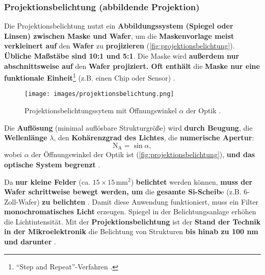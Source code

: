 \documentclass{article} %
\begin{document}


\vspace{1em}

\subsubsection{Projektionsbelichtung (abbildende Projektion)}

Die Projektionsbelichtung nutzt ein \textbf{Abbildungssystem (Spiegel oder Linsen) zwischen Maske und Wafer}, um die \textbf{Maskenvorlage meist verkleinert auf} den \textbf{Wafer} zu \textbf{projizieren} (\autoref{fig:projektionsbelichtung}). \textbf{Übliche Maßstäbe sind 10:1 und 5:1}. Die Maske wird \textbf{außerdem nur abschnittsweise auf} den \textbf{Wafer projiziert. Oft enthält} die \textbf{Maske nur eine funktionale Einheit}\footnote{``Step and Repeat''-Verfahren \cite{schmid2024}.} (z.B. einen Chip oder Sensor) \cite{schmid2024,Mescheder2004}.

\begin{figure}[htb!]
    \centering
    \texttt{[image: images/projektionsbelichtung.png]} %
    \captionsetup{labelfont=bf, width=.55\textwidth} %
    \caption{Projektionsbelichtungssytem mit Öffnungswinkel $\alpha$ der Optik \cite{schmid2024}.}
    \label{fig:projektionsbelichtung}
\end{figure}

\vspace{1em}

Die \textbf{Auflösung} (minimal auflösbare Strukturgröße) wird \textbf{durch Beugung}, die \textbf{Wellenlänge} $\lambda$, den \textbf{Kohärenzgrad des Lichtes}, die \textbf{numerische Apertur}:
$$
\mathrm{N_A} = \sin{\alpha},
$$ wobei $\alpha$ der Öffnungswinkel der Optik ist (\autoref{fig:projektionsbelichtung}), \textbf{und das optische System begrenzt} \cite{schmid2024}. 

\vspace{1em}

Da \textbf{nur kleine Felder} (ca. $15 \times 15 \, \mathrm{mm^2}$) \textbf{belichtet} werden können, \textbf{muss der Wafer schrittweise bewegt werden, um} die \textbf{gesamte Si-Scheib}e (z.B. 6-Zoll-Wafer) \textbf{zu belichten} \cite{Mescheder2004,schmid2024}. Damit diese Anwendung funktioniert, muss ein Filter \textbf{monochromatisches Licht} erzeugen. Spiegel in der Belichtungsanlage erhöhen die Lichtintensität. Mit der \textbf{Projektionsbelichtung} ist der \textbf{Stand der Technik in der Mikroelektronik} die Belichtung von Strukturen \textbf{bis hinab zu 100 nm und darunter} \cite{schmid2024}.
\end{document}
